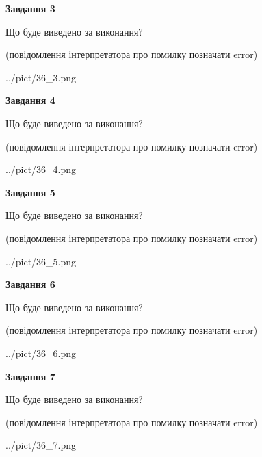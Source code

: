 \documentclass[12pt, ukrainian]{article}
\begin{document}
{\begin {large}
{\begin {center}\textbf{Завдання 3}\end {center}}\par
Що буде виведено за виконання?\par
 (повідомлення інтерпретатора про помилку позначати error)\par
\begin{center}
	{../pict/36_3.png}
\end{center}
\newpage

{\begin {center}\textbf{Завдання 4}\end {center}}\par
Що буде виведено за виконання?\par
 (повідомлення інтерпретатора про помилку позначати error)\par
\begin{center}
	{../pict/36_4.png}
\end{center}
\newpage

{\begin {center}\textbf{Завдання 5}\end {center}}\par
Що буде виведено за виконання?\par
 (повідомлення інтерпретатора про помилку позначати error)\par
\begin{center}
	{../pict/36_5.png}
\end{center}
\newpage

{\begin {center}\textbf{Завдання 6}\end {center}}\par
Що буде виведено за виконання?\par
 (повідомлення інтерпретатора про помилку позначати error)\par
\begin{center}
	{../pict/36_6.png}
\end{center}
\newpage

{\begin {center}\textbf{Завдання 7}\end {center}}\par
Що буде виведено за виконання?\par
 (повідомлення інтерпретатора про помилку позначати error)\par
\begin{center}
	{../pict/36_7.png}
\end{center}
\newpage


\end{large}}
\end{document}
